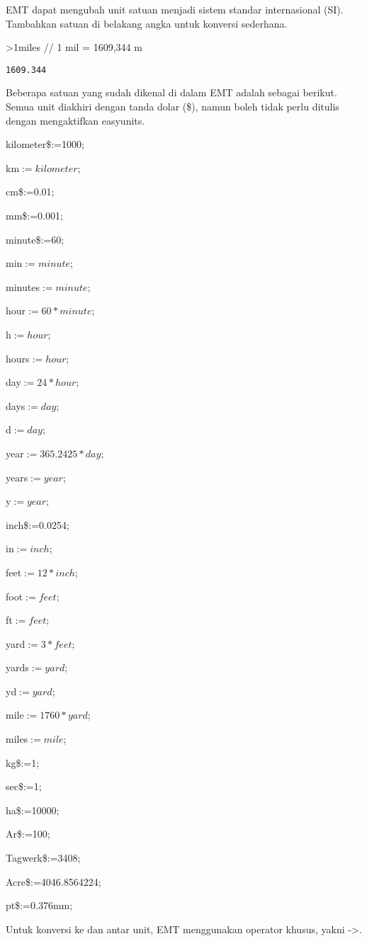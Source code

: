 \documentclass[
]{book}
\begin{document}
EMT dapat mengubah unit satuan menjadi sistem standar internasional (SI). Tambahkan satuan di belakang angka untuk konversi sederhana.

\textgreater1miles // 1 mil = 1609,344 m

\begin{verbatim}
1609.344
\end{verbatim}

Beberapa satuan yang sudah dikenal di dalam EMT adalah sebagai berikut. Semua unit diakhiri dengan tanda dolar (\$), namun boleh tidak perlu ditulis dengan mengaktifkan easyunits.

kilometer\$:=1000;

km\(:=kilometer\);

cm\$:=0.01;

mm\$:=0.001;

minute\$:=60;

min\(:=minute\);

minutes\(:=minute\);

hour\(:=60*minute\);

h\(:=hour\);

hours\(:=hour\);

day\(:=24*hour\);

days\(:=day\);

d\(:=day\);

year\(:=365.2425*day\);

years\(:=year\);

y\(:=year\);

inch\$:=0.0254;

in\(:=inch\);

feet\(:=12*inch\);

foot\(:=feet\);

ft\(:=feet\);

yard\(:=3*feet\);

yards\(:=yard\);

yd\(:=yard\);

mile\(:=1760*yard\);

miles\(:=mile\);

kg\$:=1;

sec\$:=1;

ha\$:=10000;

Ar\$:=100;

Tagwerk\$:=3408;

Acre\$:=4046.8564224;

pt\$:=0.376mm;

Untuk konversi ke dan antar unit, EMT menggunakan operator khusus, yakni -\textgreater.
\end{document}
